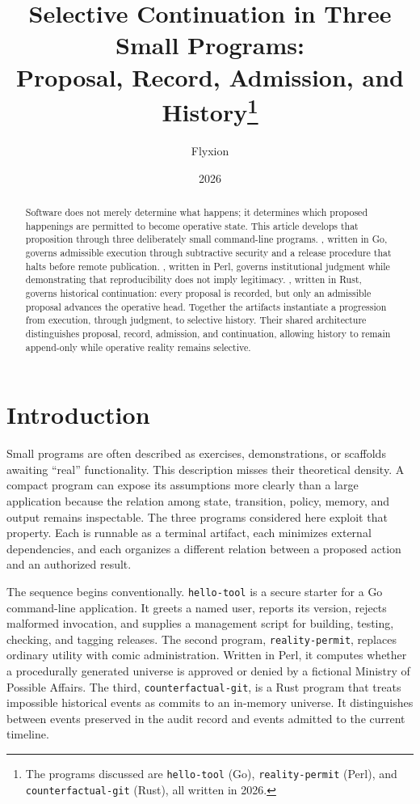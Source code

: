 \documentclass[11pt]{article}
\title{Selective Continuation in Three Small Programs:\\
Proposal, Record, Admission, and History\thanks{The programs discussed are \texttt{hello-tool} (Go), \texttt{reality-permit} (Perl), and \texttt{counterfactual-git} (Rust), all written in 2026.}}
\author{Flyxion}
\date{2026}
\begin{document}
\maketitle

\begin{abstract}
Software does not merely determine what happens; it determines which proposed happenings are permitted to become operative state. This article develops that proposition through three deliberately small command-line programs. , written in Go, governs admissible execution through subtractive security and a release procedure that halts before remote publication. , written in Perl, governs institutional judgment while demonstrating that reproducibility does not imply legitimacy. , written in Rust, governs historical continuation: every proposal is recorded, but only an admissible proposal advances the operative head. Together the artifacts instantiate a progression from execution, through judgment, to selective history. Their shared architecture distinguishes proposal, record, admission, and continuation, allowing history to remain append-only while operative reality remains selective.
\end{abstract}

\section{Introduction}

Small programs are often described as exercises, demonstrations, or scaffolds awaiting ``real'' functionality. This description misses their theoretical density. A compact program can expose its assumptions more clearly than a large application because the relation among state, transition, policy, memory, and output remains inspectable. The three programs considered here exploit that property. Each is runnable as a terminal artifact, each minimizes external dependencies, and each organizes a different relation between a proposed action and an authorized result.

The sequence begins conventionally. \texttt{hello-tool} is a secure starter for a Go command-line application. It greets a named user, reports its version, rejects malformed invocation, and supplies a management script for building, testing, checking, and tagging releases. The second program, \texttt{reality-permit}, replaces ordinary utility with comic administration. Written in Perl, it computes whether a procedurally generated universe is approved or denied by a fictional Ministry of Possible Affairs. The third, \texttt{counterfactual-git}, is a Rust program that treats impossible historical events as commits to an in-memory universe. It distinguishes between events preserved in the audit record and events admitted to the current timeline.
\end{document}
